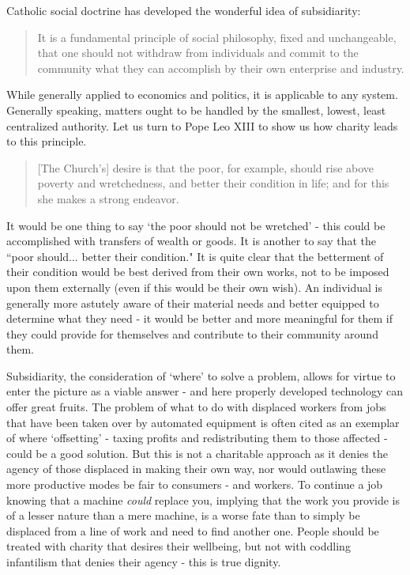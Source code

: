 \documentclass[letterpaper]{article}
\begin{document}
Catholic social doctrine has developed the wonderful idea of subsidiarity:

\begin{quote}
  It is a fundamental principle of social philosophy, fixed and unchangeable, that one should not withdraw from individuals and commit to the community what they can accomplish by their own enterprise and industry.
\end{quote}

While generally applied to economics and politics, it is applicable to any system. Generally speaking, matters ought to be handled by the smallest, lowest, least centralized authority. Let us turn to Pope Leo XIII to show us how charity leads to this principle.

\begin{quote}
  [The Church's] desire is that the poor, for example, should rise above poverty and wretchedness, and better their condition in life; and for this she makes a strong endeavor.
\end{quote}

It would be one thing to say `the poor should not be wretched' - this could be accomplished with transfers of wealth or goods. It is another to say that the ``poor should... better their condition."  It is quite clear that the betterment of their condition would be best derived from their own works, not to be imposed upon them externally (even if this would be their own wish). An individual is generally more astutely aware of their material needs and better equipped to determine what they need - it would be better and more meaningful for them if they could provide for themselves and contribute to their community around them.

Subsidiarity, the consideration of `where' to solve a problem, allows for virtue to enter the picture as a viable answer - and here properly developed technology can offer great fruits. The problem of what to do with displaced workers from jobs that have been taken over by automated equipment is often cited as an exemplar of where `offsetting' - taxing profits and redistributing them to those affected - could be a good solution. But this is not a charitable approach as it denies the agency of those displaced in making their own way, nor would outlawing these more productive modes be fair to consumers - and workers. To continue a job knowing that a machine \textit{could} replace you, implying that the work you provide is of a lesser nature than a mere machine, is a worse fate than to simply be displaced from a line of work and need to find another one. People should be treated with charity that desires their wellbeing, but not with coddling infantilism that denies their agency - this is true dignity.
\end{document}
